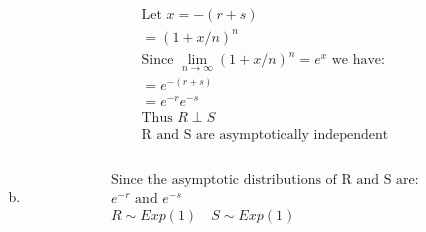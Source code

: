 \documentclass{article}
\begin{document}
\begin{flushleft}
\begin{enumerate}[(a)]
\begin{multline*}
\text{Let } x=-(r+s)\\
=\left(1+x/n\right)^n\\
\text{Since } \lim_{n\to \infty}\left(1+x/n\right)^n=e^{x} \text{ we have:}\\
=e^{-(r+s)}\\
=e^{-r}e^{-s}\\
\text{Thus } R \perp S\\
\text{R and S are asymptotically independent}\\
\end{multline*}
	\item 
\begin{multline*}\\
\text{Since the asymptotic distributions of R and S are:}\\
e^{-r} \text{ and } e^{-s}\\
R\sim Exp(1) \quad S \sim Exp(1)\\
\end{multline*}
	
\end{enumerate}

\end{flushleft}
\end{document}
